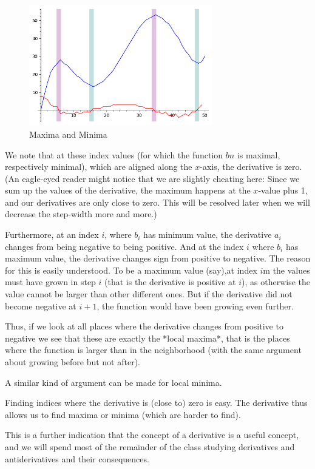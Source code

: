 \begin{figure}
\begin{center}
\includegraphics[width=8cm]{pic/pythder2.png}
\end{center}
\caption{Maxima and Minima}
\label{figpythder2}
\end{figure}

We note that at these index values (for which the function $bn$ is maximal,
respectively minimal), which are aligned along the $x$-axis, the derivative
is zero. (An eagle-eyed reader might notice that we are slightly cheating
here: Since we sum up the values of the derivative, the maximum happens at
the $x$-value plus 1, and our derivatives are only close to zero. This will
be resolved later when we will decrease the step-width more and more.)

Furthermore, at an index $i$, where $b_i$ has minimum value, the derivative
$a_i$ changes from being negative to being positive. And at the index $i$
where $b_i$ has maximum value, the derivative changes sign from positive to
negative.  The reason for this is easily understood. To be a maximum value
(say),at index $i$m the values must have grown in step $i$ (that is the
derivative is positive at $i$), as otherwise the value cannot be larger than
other different ones. But if the derivative did not become negative at
$i+1$, the function would have been growing even further.

Thus, if we look at all places where the derivative changes from positive to
negative we see that these are exactly the *local maxima*, that is the
places where the function is larger than in the neighborhood (with the same
argument about growing before but not after).

A similar kind of argument can be made for local minima.

Finding indices where the derivative is (close to) zero is easy. The
derivative thus allows us to find maxima or minima (which are harder to
find).
\smallskip

This is a further indication that the concept of a derivative is a useful
concept, and we will spend most of the remainder of the class studying
derivatives and antiderivatives and their consequences.

